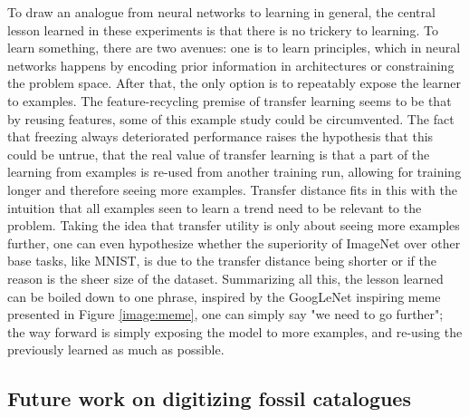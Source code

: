 \documentclass{article}
\begin{document}
To draw an analogue from neural networks to learning in general, the central lesson learned in these experiments 
is that there is no trickery to learning. To learn something, there are two avenues: one is to learn principles, which in 
neural networks happens by encoding prior information in architectures or constraining the problem space. After that, the only 
option is to repeatably expose the learner to examples. The feature-recycling premise of transfer learning seems to be that 
by reusing features, some of this example study could be circumvented. The fact that freezing always deteriorated performance
raises the hypothesis that this could be untrue, that the real value of transfer learning is that a part of the learning from 
examples is re-used from another training run, allowing for training longer and therefore seeing more examples. Transfer distance 
fits in this with the intuition that all examples seen to learn a trend need to be relevant to the problem. 
Taking the idea that transfer utility is only about 
seeing more examples further, one can even hypothesize whether the superiority of ImageNet over other base tasks, like MNIST, is 
due to the transfer distance being shorter or if the reason is the sheer size of the dataset. Summarizing all this, the lesson learned
can be boiled down to one phrase, inspired by the GoogLeNet inspiring meme presented in 
Figure \ref{image:meme}, one can simply say "we need to go further"; the way forward is simply exposing the model to more examples, 
and re-using the previously learned as much as possible.

\subsection{Future work on digitizing fossil catalogues}
\end{document}

